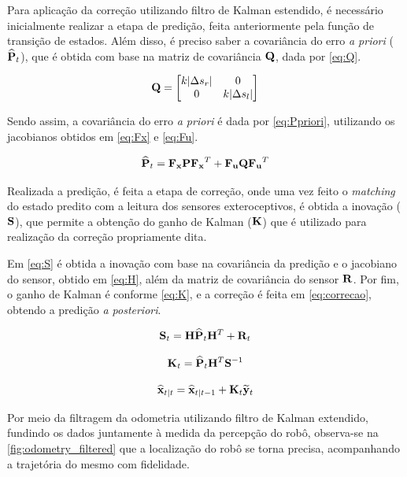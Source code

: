 Para aplicação da correção utilizando filtro de Kalman estendido, é necessário inicialmente realizar a etapa de predição, feita anteriormente pela função de transição de estados. Além disso, é preciso saber a covariância do erro \textit{a priori} ($\widehat{\mathbf{P}}_t$), que é obtida com base na matriz de covariância $\mathbf{Q}$, dada por \eqref{eq:Q}.

\begin{equation}\label{eq:Q}
	\mathbf{Q} = \begin{bmatrix}
		k|\Delta s_r| & 0 \\
		0 & k|\Delta s_l|
	\end{bmatrix}
\end{equation}

Sendo assim, a covariância do erro \textit{a priori} é dada por \eqref{eq:Ppriori}, utilizando os jacobianos obtidos em \eqref{eq:Fx} e \eqref{eq:Fu}.

\begin{equation}\label{eq:Ppriori}
	\widehat{\mathbf{P}}_t = \mathbf{F_x}\mathbf{P}\mathbf{F_x}^T + \mathbf{F_u}\mathbf{Q}\mathbf{F_u}^T 
\end{equation}

Realizada a predição, é feita a etapa de correção, onde uma vez feito o \textit{matching} do estado predito com a leitura dos sensores exteroceptivos, é obtida a inovação ($\mathbf{S}$), que permite a obtenção do ganho de Kalman ($\mathbf{K}$) que é utilizado para realização da correção propriamente dita.

Em \eqref{eq:S} é obtida a inovação com base na covariância da predição e o jacobiano do sensor, obtido em \eqref{eq:H}, além da matriz de covariância do sensor $\mathbf{R}$. Por fim, o ganho de Kalman é conforme \eqref{eq:K}, e a correção é feita em \eqref{eq:correcao}, obtendo a predição \textit{a posteriori}.

\begin{equation}\label{eq:S}
	\mathbf{S}_t = \mathbf{H}\widehat{\mathbf{P}}_t\mathbf{H}^T + \mathbf{R}_t
\end{equation}

\begin{equation}\label{eq:K}
	\mathbf{K}_t = \widehat{\mathbf{P}}_t\mathbf{H}^T\mathbf{S}^{-1}
\end{equation}

\begin{equation}\label{eq:correcao}
	\widehat{\mathbf{x}}_{t|t} = 	\widehat{\mathbf{x}}_{t|t-1} + \mathbf{K}_t \widetilde{\mathbf{y}}_t
\end{equation}

Por meio da filtragem da odometria utilizando filtro de Kalman extendido, fundindo os dados juntamente à medida da percepção do robô, observa-se na \autoref{fig:odometry_filtered} que a localização do robô se torna precisa, acompanhando a trajetória do mesmo com fidelidade.



